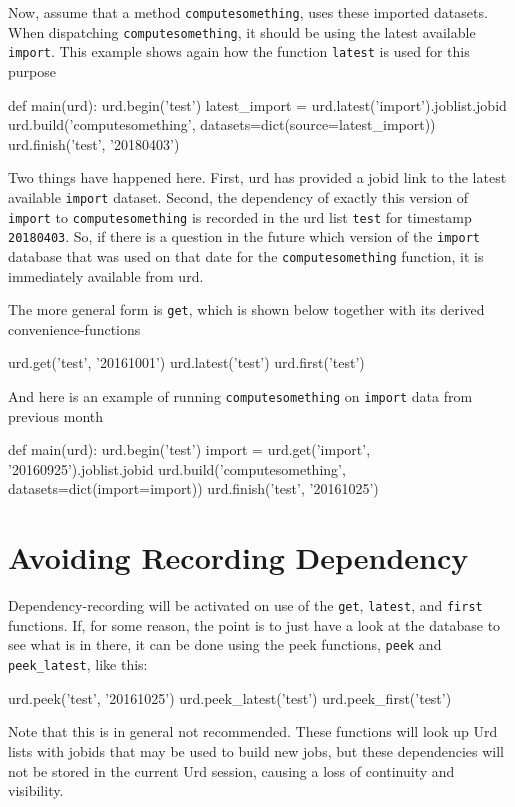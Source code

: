 Now, assume that a method \texttt{computesomething}, uses these
imported datasets.  When dispatching \texttt{computesomething}, it
should be using the latest available \texttt{import}.  This example
shows again how the function \texttt{latest} is used for this purpose
\begin{python}
def main(urd):
    urd.begin('test')
    latest_import = urd.latest('import').joblist.jobid
    urd.build('computesomething', datasets=dict(source=latest_import))
    urd.finish('test', '20180403')
\end{python}
Two things have happened here.  First, urd has provided a jobid link
to the latest available \texttt{import} dataset.  Second, the
dependency of exactly this version of \texttt{import} to
\texttt{computesomething} is recorded in the urd list \texttt{test}
for timestamp \texttt{20180403}.  So, if there is a question in the
future which version of the \texttt{import} database that was used on
that date for the \texttt{computesomething} function, it is
immediately available from urd.

The more general form is \texttt{get}, which is shown below together
with its derived convenience-functions
\begin{python}
  urd.get('test', '20161001')
  urd.latest('test')
  urd.first('test')
\end{python}
And here is an example of running \texttt{computesomething} on \texttt{import} data
from previous month
\begin{python}
def main(urd):
  urd.begin('test')
  import = urd.get('import', '20160925').joblist.jobid
  urd.build('computesomething', datasets=dict(import=import))
  urd.finish('test', '20161025')
\end{python}



\section{Avoiding Recording Dependency}
Dependency-recording will be activated on use of the \texttt{get},
\texttt{latest}, and \texttt{first} functions.  If, for some reason,
the point is to just have a look at the database to see what is in
there, it can be done using the peek functions, \texttt{peek} and
\texttt{peek\_latest}, like this:
\begin{python}
urd.peek('test', '20161025')
urd.peek_latest('test')
urd.peek_first('test')
\end{python}
Note that this is in general not recommended.  These functions will
look up Urd lists with jobids that may be used to build new jobs, but
these dependencies will not be stored in the current Urd session,
causing a loss of continuity and visibility.



